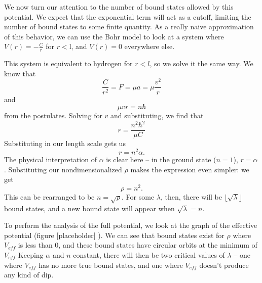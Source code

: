 \documentclass[12pt,twoside]{reedthesis}
\newcommand{\eqn}[1]{\begin{equation}#1\end{equation}}
\begin{document}
We now turn our attention to the number of bound states allowed by this potential. We expect that the exponential term will act as a cutoff, limiting the number of bound states to some finite quantity. As a really naive approximation of this behavior, we can use the Bohr model to look at a system where $V(r) = -\frac{C}{r}$ for $r < $l, and $V(r) = 0$ everywhere else.

This system is equivalent to hydrogen for $r<l$, so we solve it the same way. We know that
\eqn{
\frac{C}{r^2} = F = \mu a = \mu \frac{v^2}{r}
}
and 
\eqn{
\mu v r = n\hbar
}
from the postulates. Solving for $v$ and substituting, we find that
\eqn{
r = \frac{n^2 \hbar^2}{\mu C}
}
Substituting in our length scale gets us 
\eqn{
r = n^2 \alpha \mbox{.}
}
The physical interpretation of $\alpha$ is clear here -- in the ground state ($n = 1$), $r = \alpha$. Substituting our nondimensionalized $\rho$ makes the expression even simpler: we get
\eqn{
\rho = n^2\mbox{.}
}
This can be rearranged to be $n = \sqrt{\rho}$. For some $\lambda$, then, there will be $\lfloor \sqrt{\lambda} \rfloor$ bound states, and a new bound state will appear when $\sqrt{\lambda} = n$.

To perform the analysis of the full potential, we look at the graph of the effective potential (figure [placeholder]%
). 
We can see that bound states exist for $\rho$ where $V_{eff}$ is less than 0, and these bound states have circular orbits at the minimum of $V_{eff}$ Keeping $\alpha$ and $n$ constant, there will then be two critical values of $\lambda$ -- one where $V_{eff}$ has no more true bound states, and one where $V_{eff}$ doesn't produce any kind of dip.
\end{document}
